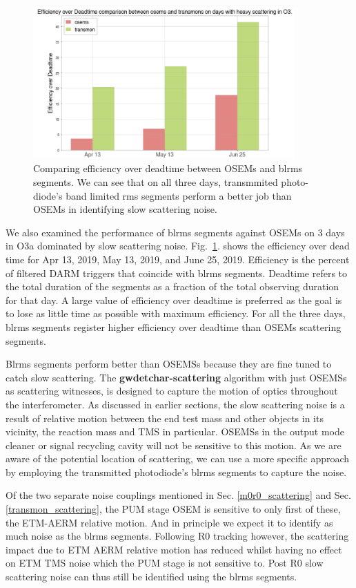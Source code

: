 \documentclass[12pt]{iopart}
\begin{document}
\begin{figure}[h]
    \centering
    \includegraphics[width=10cm]{osemstrans.png}
    \caption{Comparing efficiency over deadtime between OSEMs and blrms segments. We can see that on all three days, transmmited photo-diode's band limited rms segments perform a better job than OSEMs in identifying slow scattering noise.}
    \label{fig:osemtrans}
\end{figure}
\vspace{2cm}
We also examined the performance of blrms segments against OSEMs on 3 days in O3a dominated by slow scattering noise. Fig.~\ref{fig:osemtrans}. shows the efficiency over dead time for Apr 13, 2019, May 13, 2019, and June 25, 2019. Efficiency is the percent of filtered DARM triggers that coincide with blrms segments. Deadtime refers to the total duration of the segments as a fraction of the total observing duration for that day. A large value of efficiency over deadtime is preferred as the goal is to lose as little time as possible with maximum efficiency. For all the three days, blrms segments register higher efficiency over deadtime than OSEMs scattering segments.

Blrms segments perform better than OSEMSs because they are fine tuned to catch slow scattering. The \textbf{gwdetchar-scattering} algorithm with just OSEMSs as scattering witnesses, is designed to capture the motion of optics throughout the interferometer. As discussed in earlier sections, the slow scattering noise is a result of relative motion between the end test mass and other objects in its vicinity, the reaction mass and TMS in particular. OSEMSs in the output mode cleaner or signal recycling cavity will not be sensitive to this motion. As we are aware of the potential location of scattering, we can use a more specific approach by employing the transmitted photodiode’s blrms segments to capture the noise. 


Of the two separate noise couplings mentioned in Sec. \ref{m0r0_scattering}  and Sec. \ref{transmon_scattering}, the PUM stage OSEM is sensitive to only first of these, the ETM-AERM relative motion. And in principle we expect it to identify as much noise as the blrms segments. Following R0 tracking however, the scattering impact due to ETM AERM relative motion has reduced whilst having no effect on ETM TMS noise which the PUM stage is not sensitive to. Post R0 slow scattering noise can thus still be identified using the blrms segments.
\end{document}
